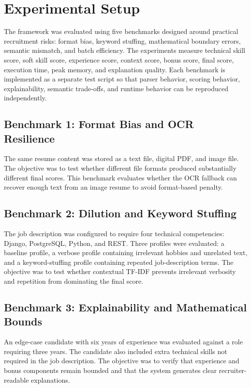 \section{Experimental Setup}
The framework was evaluated using five benchmarks designed around practical recruitment risks: format bias, keyword stuffing, mathematical boundary errors, semantic mismatch, and batch efficiency. The experiments measure technical skill score, soft skill score, experience score, context score, bonus score, final score, execution time, peak memory, and explanation quality. Each benchmark is implemented as a separate test script so that parser behavior, scoring behavior, explainability, semantic trade-offs, and runtime behavior can be reproduced independently.

\subsection{Benchmark 1: Format Bias and OCR Resilience}
The same resume content was stored as a text file, digital PDF, and image file. The objective was to test whether different file formats produced substantially different final scores. This benchmark evaluates whether the OCR fallback can recover enough text from an image resume to avoid format-based penalty.

\subsection{Benchmark 2: Dilution and Keyword Stuffing}
The job description was configured to require four technical competencies: Django, PostgreSQL, Python, and REST. Three profiles were evaluated: a baseline profile, a verbose profile containing irrelevant hobbies and unrelated text, and a keyword-stuffing profile containing repeated job-description terms. The objective was to test whether contextual TF-IDF prevents irrelevant verbosity and repetition from dominating the final score.

\subsection{Benchmark 3: Explainability and Mathematical Bounds}
An edge-case candidate with six years of experience was evaluated against a role requiring three years. The candidate also included extra technical skills not required in the job description. The objective was to verify that experience and bonus components remain bounded and that the system generates clear recruiter-readable explanations.

